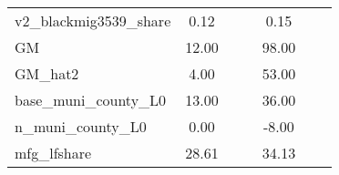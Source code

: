 \begin{table}[htbp]
\begin{tabular}{l*{2}{ccc}}
v2\_blackmig3539\_share&        0.12&            &            &        0.15&            &            \\
GM                  &       12.00&            &            &       98.00&            &            \\
GM\_hat2             &        4.00&            &            &       53.00&            &            \\
base\_muni\_county\_L0 &       13.00&            &            &       36.00&            &            \\
n\_muni\_county\_L0    &        0.00&            &            &       -8.00&            &            \\
mfg\_lfshare         &       28.61&            &            &       34.13&            &            \\
\bottomrule
\end{tabular}
\end{table}
